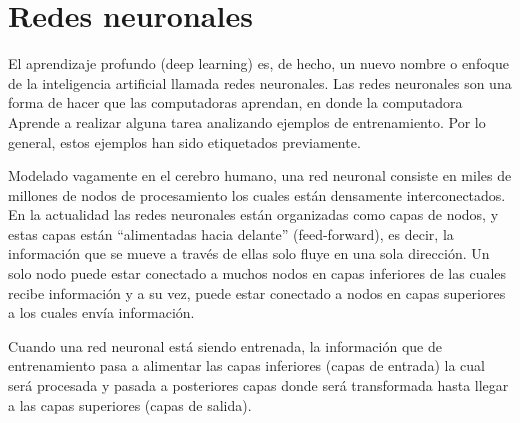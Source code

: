 \documentclass[12pt, a4paper, titlepage]{report}
\begin{document}
	    \section{Redes neuronales}
	    El aprendizaje profundo (deep learning) es, de hecho, un nuevo nombre o enfoque de la inteligencia artificial llamada redes neuronales. Las redes neuronales son una forma de hacer que las computadoras aprendan, en donde la computadora \Gls{Aprende} a realizar alguna tarea analizando ejemplos de entrenamiento. Por lo general, estos ejemplos han sido etiquetados previamente.\par
		Modelado vagamente en el cerebro humano, una red neuronal consiste en miles de millones de nodos de procesamiento los cuales están densamente interconectados. En la actualidad las redes neuronales están organizadas como capas de nodos, y estas capas están “alimentadas hacia delante” (feed-forward), es decir, la información que se mueve a través de ellas solo fluye en una sola dirección. Un solo nodo puede estar conectado a muchos nodos en capas inferiores de las cuales recibe información y a su vez, puede estar conectado a nodos en capas superiores a los cuales envía información.\par
		Cuando una red neuronal está siendo entrenada, la información que de entrenamiento pasa a alimentar las capas inferiores (capas de entrada) la cual será procesada y pasada a posteriores capas donde será transformada hasta llegar a las capas superiores (capas de salida).\cite{refQueSonRedesNeu}
\end{document}
